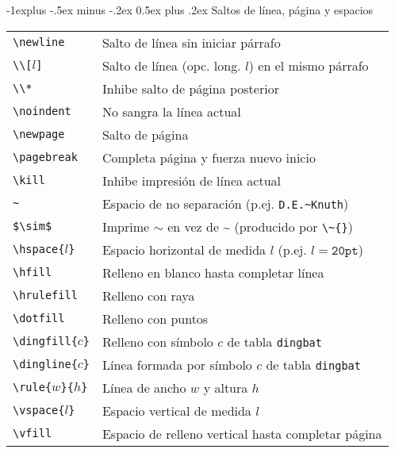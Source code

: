 \documentclass[10pt,landscape,a4paper]{article}
\makeatletter
\renewcommand{\subsection}{\@startsection{subsection}{2}{0mm}%
                                {-1explus -.5ex minus -.2ex}%
                                {0.5ex plus .2ex}%
                                {\normalfont\normalsize\bfseries}}
\makeatother
\begin{document}
\begin{multicols}{3}
\subsection{Saltos de línea, página y espacios}
\begin{tabular}{@{}p{\the\MyLen}%
                @{}p{\linewidth-\the\MyLen}@{}}
\verb!\newline!			&  Salto de línea sin iniciar párrafo  \\
\verb!\\[!$l$\verb!]!	&  Salto de línea (opc. long. $l$) en el mismo párrafo   \\
\verb!\\*!         		&  Inhibe salto de página posterior \\
\verb!\noindent!   		&  No sangra la línea actual \\
\verb!\newpage!    		&  Salto de página \\
\verb!\pagebreak!  		&  Completa página y fuerza nuevo inicio \\
\verb!\kill!       		&  Inhibe impresión de línea actual \\
\verb!~!       			&  Espacio de no separación (p.ej. \verb!D.E.~Knuth!) \\
\verb!$\sim$!  			&  Imprime $\sim$ en vez de \~{} (producido por \verb!\~{}!) \\
\verb!\hspace{!$l$\verb!}! 		& Espacio horizontal de medida $l$
                                (p.ej. $l=\mathtt{20pt}$) \\
\verb!\hfill!  			& Relleno en blanco hasta completar línea\\
\verb!\hrulefill!  		& Relleno con raya \\
\verb!\dotfill!    		& Relleno con puntos \\
\verb!\dingfill{!$c$\verb!}!    & Relleno con símbolo $c$ de tabla \texttt{dingbat} \\
\verb!\dingline{!$c$\verb!}!    & Línea formada por símbolo $c$ de tabla \texttt{dingbat} \\
\verb!\rule{!$w$\verb!}{!$h$\verb!}! & Línea de ancho $w$ y altura $h$ \\
\verb!\vspace{!$l$\verb!}! 		& Espacio vertical de medida $l$ \\
\verb!\vfill!  			& Espacio de relleno vertical hasta completar página \\
\end{tabular}






\end{multicols}
\end{document}

